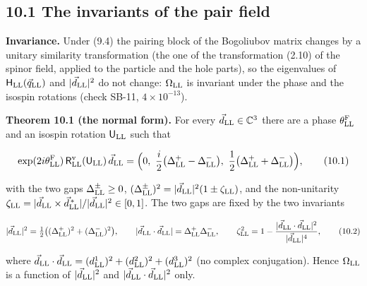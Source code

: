 \documentclass[
  10pt,
]{article}
\begin{document}
\hypertarget{the-invariants-of-the-pair-field}{%
\subsection{10.1 The invariants of the pair
field}\label{the-invariants-of-the-pair-field}}

\textbf{Invariance.} Under (9.4) the pairing block of the Bogoliubov
matrix changes by a unitary similarity transformation (the one of the
transformation (2.10) of the spinor field, applied to the particle and
the hole parts), so the eigenvalues of
\(\mathsf H_{\rm LL}(\vec q_{\rm LL})\) and
\(\lvert\vec d_{\rm LL}\rvert^2\) do not change: \(\Omega_{\rm LL}\) is
invariant under the phase and the isospin rotations (check SB-11,
\(4\times10^{-13}\)).

\textbf{Theorem 10.1 (the normal form).} For every
\(\vec d_{\rm LL}\in\mathbb C^3\) there are a phase
\(\theta^{\rm F}_{\rm LL}\) and an isospin rotation
\(\mathsf U_{\rm LL}\) such that

\[\exp(2i\theta^{\rm F}_{\rm LL})\,\mathsf R^{\rm v}_{\rm LL}(\mathsf U_{\rm LL})\,\vec d_{\rm LL}=\Big(0,\ \frac i2\big(\Delta^+_{\rm LL}-\Delta^-_{\rm LL}\big),\ \frac12\big(\Delta^+_{\rm LL}+\Delta^-_{\rm LL}\big)\Big),\tag{10.1}\]

with the two gaps \(\Delta^\pm_{\rm LL}\ge0\),
\((\Delta^\pm_{\rm LL})^2=\lvert\vec d_{\rm LL}\rvert^2(1\pm\zeta_{\rm LL})\),
and the non-unitarity
\(\zeta_{\rm LL}=\lvert\vec d_{\rm LL}\times\vec d^{\,*}_{\rm LL}\rvert/\lvert\vec d_{\rm LL}\rvert^2\in[0,1]\).
The two gaps are fixed by the two invariants

\[\lvert\vec d_{\rm LL}\rvert^2=\tfrac12\big((\Delta^+_{\rm LL})^2+(\Delta^-_{\rm LL})^2\big),\qquad\lvert\vec d_{\rm LL}\cdot\vec d_{\rm LL}\rvert=\Delta^+_{\rm LL}\Delta^-_{\rm LL},\qquad\zeta_{\rm LL}^2=1-\frac{\lvert\vec d_{\rm LL}\cdot\vec d_{\rm LL}\rvert^2}{\lvert\vec d_{\rm LL}\rvert^4},\tag{10.2}\]

where
\(\vec d_{\rm LL}\cdot\vec d_{\rm LL}=(d^1_{\rm LL})^2+(d^2_{\rm LL})^2+(d^3_{\rm LL})^2\)
(no complex conjugation). Hence \(\Omega_{\rm LL}\) is a function of
\(\lvert\vec d_{\rm LL}\rvert^2\) and
\(\lvert\vec d_{\rm LL}\cdot\vec d_{\rm LL}\rvert^2\) only.
\end{document}
